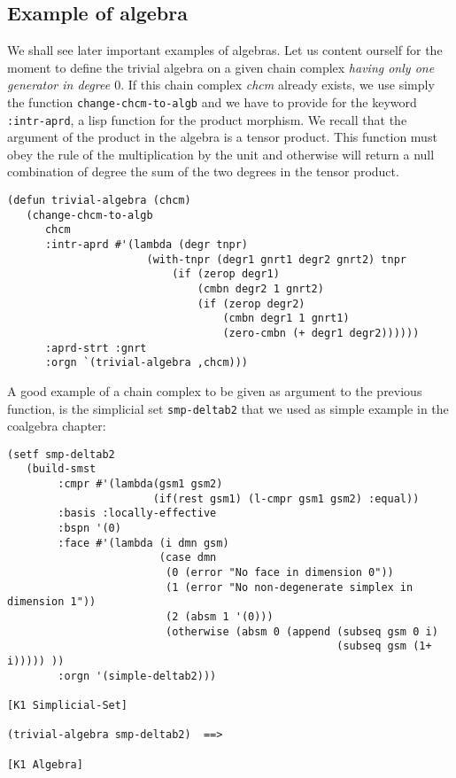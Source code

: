 \subsection {Example of algebra}

We shall see later important examples of algebras. Let us content ourself for the moment
to define the trivial algebra on a given chain complex {\em having only one generator in degree $0$}.
If  this chain complex {\em chcm} already exists, we
use simply the function {\tt change-chcm-to-algb} and we have to provide for the keyword {\tt :intr-aprd},
a lisp function for the product morphism. We recall that the argument of the product in the algebra is a tensor product.
This function must obey the rule of the multiplication by the unit
and otherwise will return a null combination of degree the sum of the two degrees in the tensor product.
{\footnotesize\begin{verbatim}
(defun trivial-algebra (chcm)
   (change-chcm-to-algb
      chcm
      :intr-aprd #'(lambda (degr tnpr)
                      (with-tnpr (degr1 gnrt1 degr2 gnrt2) tnpr
                          (if (zerop degr1)
                              (cmbn degr2 1 gnrt2)
                              (if (zerop degr2)
                                  (cmbn degr1 1 gnrt1)
                                  (zero-cmbn (+ degr1 degr2))))))
      :aprd-strt :gnrt
      :orgn `(trivial-algebra ,chcm)))
\end{verbatim}}
A good example of  a chain complex to be given as argument to the previous function,
is the simplicial set {\tt smp-deltab2} that we used as
simple example in the coalgebra chapter:
{\footnotesize\begin{verbatim}
(setf smp-deltab2
   (build-smst
        :cmpr #'(lambda(gsm1 gsm2)
                       (if(rest gsm1) (l-cmpr gsm1 gsm2) :equal))
        :basis :locally-effective
        :bspn '(0)
        :face #'(lambda (i dmn gsm)
                        (case dmn
                         (0 (error "No face in dimension 0"))
                         (1 (error "No non-degenerate simplex in dimension 1"))
                         (2 (absm 1 '(0)))
                         (otherwise (absm 0 (append (subseq gsm 0 i)
                                                    (subseq gsm (1+ i))))) ))
        :orgn '(simple-deltab2)))

[K1 Simplicial-Set]

(trivial-algebra smp-deltab2)  ==>

[K1 Algebra]
\end{verbatim}}
